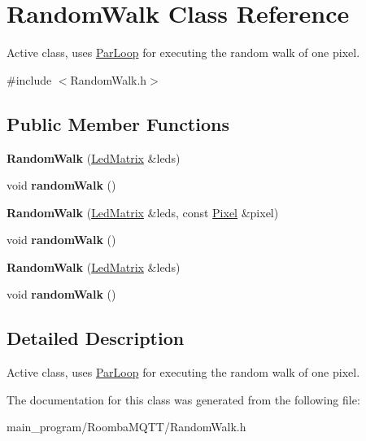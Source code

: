 \hypertarget{class_random_walk}{}\section{Random\+Walk Class Reference}
\label{class_random_walk}


Active class, uses \hyperlink{class_par_loop}{Par\+Loop} for executing the random walk of one pixel.  




{\ttfamily \#include $<$Random\+Walk.\+h$>$}

\subsection*{Public Member Functions}
\begin{DoxyCompactItemize}
\item 
{\bfseries Random\+Walk} (\hyperlink{class_led_matrix}{Led\+Matrix} \&leds)\hypertarget{class_random_walk_aeb88c4057ad738c0d5238ed8278daea9}{}\label{class_random_walk_aeb88c4057ad738c0d5238ed8278daea9}

\item 
void {\bfseries random\+Walk} ()\hypertarget{class_random_walk_a90d75ccc484629a8e631c6da39a998b9}{}\label{class_random_walk_a90d75ccc484629a8e631c6da39a998b9}

\item 
{\bfseries Random\+Walk} (\hyperlink{class_led_matrix}{Led\+Matrix} \&leds, const \hyperlink{class_pixel}{Pixel} \&pixel)\hypertarget{class_random_walk_aadee9e7e81ba62ca6b6aeeeb924484df}{}\label{class_random_walk_aadee9e7e81ba62ca6b6aeeeb924484df}

\item 
void {\bfseries random\+Walk} ()\hypertarget{class_random_walk_a90d75ccc484629a8e631c6da39a998b9}{}\label{class_random_walk_a90d75ccc484629a8e631c6da39a998b9}

\item 
{\bfseries Random\+Walk} (\hyperlink{class_led_matrix}{Led\+Matrix} \&leds)\hypertarget{class_random_walk_aeb88c4057ad738c0d5238ed8278daea9}{}\label{class_random_walk_aeb88c4057ad738c0d5238ed8278daea9}

\item 
void {\bfseries random\+Walk} ()\hypertarget{class_random_walk_a90d75ccc484629a8e631c6da39a998b9}{}\label{class_random_walk_a90d75ccc484629a8e631c6da39a998b9}

\end{DoxyCompactItemize}


\subsection{Detailed Description}
Active class, uses \hyperlink{class_par_loop}{Par\+Loop} for executing the random walk of one pixel. 

The documentation for this class was generated from the following file\+:\begin{DoxyCompactItemize}
\item 
main\+\_\+program/\+Roomba\+M\+Q\+T\+T/Random\+Walk.\+h\end{DoxyCompactItemize}
